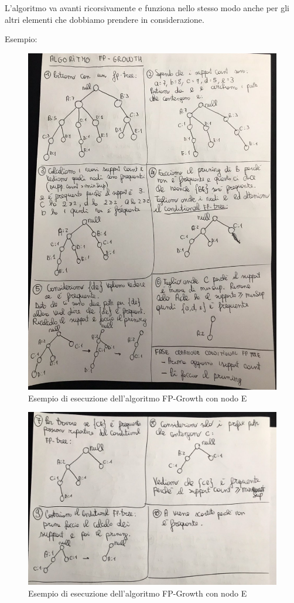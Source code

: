 \documentclass[14pt]{extreport}
\begin{document}
L'algoritmo va avanti ricorsivamente e funziona nello stesso modo anche per gli altri elementi che dobbiamo prendere in considerazione.

Esempio:
\begin{figure}[h!]
  \includegraphics[width=\linewidth]{FPGrowth1.png}
  \caption{Esempio di esecuzione dell'algoritmo FP-Growth con nodo E}
\end{figure}

\begin{figure}[h!]
  \includegraphics[width=\linewidth]{FPGrowth2.png}
  \caption{Esempio di esecuzione dell'algoritmo FP-Growth con nodo E}
\end{figure}
\end{document}

